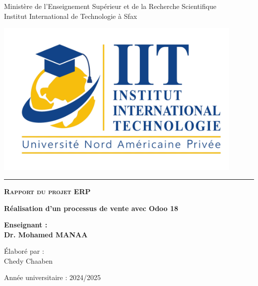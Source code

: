 \noindent
\begin{minipage}[c]{0.6\textwidth}
    \vspace{6mm}
    \raggedright
    Ministère de l'Enseignement Supérieur et de la Recherche Scientifique\\
    Institut International de Technologie à Sfax
\end{minipage}
\hfill
\begin{minipage}[c]{0.35\textwidth}
    \raggedleft
    \includegraphics[width=0.9\textwidth]{LogoIIT}
\end{minipage}

\vspace{5mm}
\hrule
\vspace{2.5cm}

\begin{center}
    {\fontsize{25pt}{30pt}\selectfont \textbf{\textsc{Rapport du projet ERP}}}
    
    \vspace{2cm}
    
    {\fontsize{20pt}{24pt}\selectfont \textbf{Réalisation d’un processus de vente avec Odoo 18}}

    \vspace{4cm}

    {\fontsize{15pt}{18pt}\selectfont \textbf{Enseignant :}}\\[0.5em]
    {\fontsize{12pt}{16pt} \textbf{Dr. Mohamed MANAA}}

    \vspace{4cm}
    
    {\fontsize{15pt}{18pt}\selectfont Élaboré par :}\\[0.5em]
    {\fontsize{12pt}{16pt} Chedy Chaaben}
    
    \vspace{1cm}
    
    {\fontsize{16pt}{20pt}\selectfont Année universitaire : 2024/2025}
\end{center}
